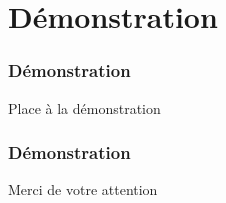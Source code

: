 \section{Démonstration}
    
    \begin{frame}
        \frametitle{Démonstration}
        
        \begin{center}
            \huge{Place à la démonstration}
        \end{center}
        
    \end{frame}
        
    \begin{frame}
        \frametitle{Démonstration}
        
        \begin{center}
            \huge{Merci de votre attention}
        \end{center}
        
    \end{frame}